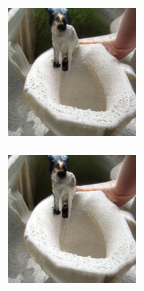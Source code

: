 \documentclass{article}
\begin{document}
\begin{figure}
\begin{subfigure}[b]{0.5\linewidth}
\begin{subfigure}[b]{0.242\linewidth}
        \end{subfigure}
        \begin{subfigure}[b]{0.242\linewidth}
        \includegraphics[width=\linewidth]{figures/imagenet128/solver_samples/imagenet128_fm_ot_59_20.png}
        \end{subfigure}
        \begin{subfigure}[b]{0.242\linewidth}
        \includegraphics[width=\linewidth]{figures/imagenet128/solver_samples/imagenet128_fm_ot_59_50.png}
        \end{subfigure}
    \end{subfigure}\\
    

\end{figure}
\end{document}
